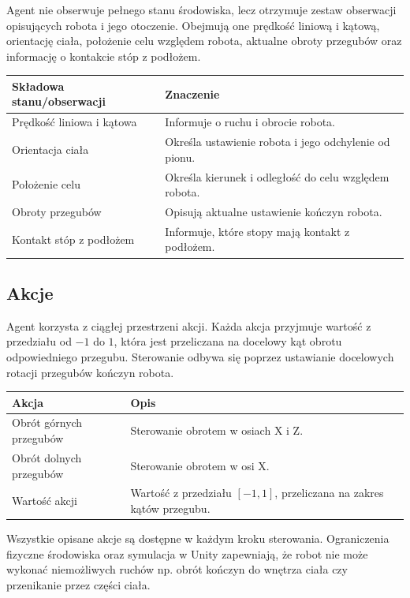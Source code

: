\documentclass[12pt]{article}
\begin{document}
Agent nie obserwuje pełnego stanu środowiska, lecz otrzymuje
zestaw obserwacji opisujących robota i jego otoczenie.
Obejmują one prędkość liniową i kątową, orientację ciała,
położenie celu względem robota, aktualne obroty przegubów
oraz informację o kontakcie stóp z podłożem.

\begin{center}
\begin{tabular}{p{}p{}}
\toprule
Składowa stanu/obserwacji & Znaczenie \\
\midrule
Prędkość liniowa i kątowa & Informuje o ruchu i obrocie robota. \\
\midrule
Orientacja ciała & Określa ustawienie robota i jego odchylenie od pionu. \\
\midrule
Położenie celu & Określa kierunek i odległość do celu względem robota. \\
\midrule
Obroty przegubów & Opisują aktualne ustawienie kończyn robota. \\
\midrule
Kontakt stóp z podłożem & Informuje, które stopy mają kontakt z podłożem. \\
\bottomrule
\end{tabular}
\end{center}

\subsection{Akcje}

Agent korzysta z ciągłej przestrzeni akcji. Każda akcja przyjmuje
wartość z przedziału od $-1$ do $1$, która jest przeliczana
na docelowy kąt obrotu odpowiedniego przegubu. Sterowanie
odbywa się poprzez ustawianie docelowych rotacji przegubów
kończyn robota.

\begin{center}
\begin{tabular}{p{}p{}}
\toprule
Akcja & Opis \\
\midrule
Obrót górnych przegubów & Sterowanie obrotem w osiach X i Z. \\
\midrule
Obrót dolnych przegubów & Sterowanie obrotem w osi X. \\
\midrule
Wartość akcji & Wartość z przedziału $[-1,1]$, przeliczana na zakres kątów przegubu. \\
\bottomrule
\end{tabular}
\end{center}

Wszystkie opisane akcje są dostępne w każdym kroku sterowania. Ograniczenia fizyczne środowiska 
oraz symulacja w Unity zapewniają, że robot nie może wykonać niemożliwych ruchów np. obrót kończyn 
do wnętrza ciała czy przenikanie przez części ciała.
\end{document}
